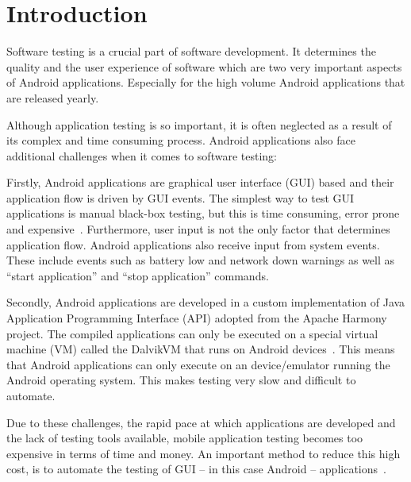 \documentclass{acm_proc_article-sp}
\begin{document}


\section{Introduction}

Software testing is a crucial part of software development. It determines the quality and the user
experience of software which are two very important aspects of Android applications. Especially for the high volume Android applications
that are released yearly. 

Although application testing is so important, it is often neglected as a result of its complex and time consuming process. Android
applications also face additional challenges when it comes to software testing:

Firstly, Android applications are graphical user interface (GUI) based and their application flow is driven by GUI events. The
simplest way to test GUI applications is manual black-box testing, but this is time consuming, error prone and
expensive~\cite{AccessibilityTech}. Furthermore, user input is not the only factor that determines application flow. Android applications
also receive input from system events. These include events such as battery low and network down warnings as well as ``start application'' and
``stop application'' commands.

Secondly, Android applications are developed in a custom implementation of Java Application Programming Interface (API)
 adopted from the Apache Harmony~\cite{harmony} project. The
compiled applications can only be executed on a special virtual machine (VM) called the DalvikVM that runs on Android devices~\cite{dalvik}. 
This means that Android applications can only execute on an device/emulator running the Android operating system. This makes testing very slow and
difficult to automate.

Due to these challenges, the rapid pace at which applications are developed and the lack of testing tools available, mobile application
testing becomes too expensive in terms of time and money. An important method to reduce this high cost, is to 
automate the testing of GUI -- in this case Android -- applications~\cite{AccessibilityTech}.
\end{document}
